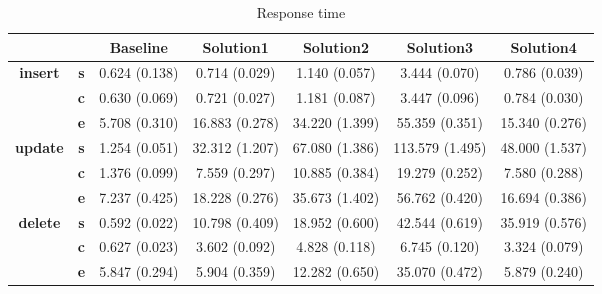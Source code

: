 \begin{table}[h]
\newcommand{\B}[1]{\colorbox{light-gray}{#1}}
 \centering
\caption{Response time}\label{t:}
\begin{tabular}{ccccccc}
\toprule
&&\textbf{Baseline} & \textbf{Solution1} & \textbf{Solution2} & \textbf{Solution3} & \textbf{Solution4}\\
\midrule
\multirow{3}{*}{\textbf{insert}} & \textbf{s} & 0.624 (0.138) & 0.714 (0.029) & 1.140 (0.057) & 3.444 (0.070) & 0.786 (0.039)\\
 & \textbf{c} & 0.630 (0.069) & 0.721 (0.027) & 1.181 (0.087) & 3.447 (0.096) & 0.784 (0.030)\\
 & \textbf{e} & 5.708 (0.310) & 16.883 (0.278) & 34.220 (1.399) & 55.359 (0.351) & 15.340 (0.276)\\
\midrule
\multirow{3}{*}{\textbf{update}} & \textbf{s} & 1.254 (0.051) & 32.312 (1.207) & 67.080 (1.386) & 113.579 (1.495) & 48.000 (1.537)\\
 & \textbf{c} & 1.376 (0.099) & 7.559 (0.297) & 10.885 (0.384) & 19.279 (0.252) & 7.580 (0.288)\\
 & \textbf{e} & 7.237 (0.425) & 18.228 (0.276) & 35.673 (1.402) & 56.762 (0.420) & 16.694 (0.386)\\
\midrule
\multirow{3}{*}{\textbf{delete}} & \textbf{s} & 0.592 (0.022) & 10.798 (0.409) & 18.952 (0.600) & 42.544 (0.619) & 35.919 (0.576)\\
 & \textbf{c} & 0.627 (0.023) & 3.602 (0.092) & 4.828 (0.118) & 6.745 (0.120) & 3.324 (0.079)\\
 & \textbf{e} & 5.847 (0.294) & 5.904 (0.359) & 12.282 (0.650) & 35.070 (0.472) & 5.879 (0.240)\\
\bottomrule
\end{tabular}
\end{table}



